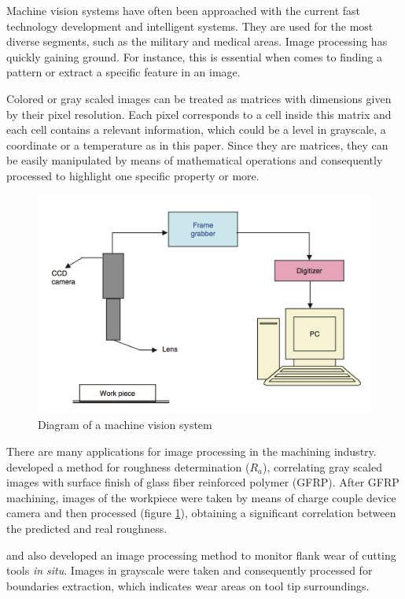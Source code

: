 Machine vision systems have often been approached with the current fast technology development and intelligent systems. They are used for the most diverse segments, such as the military and medical areas. Image processing has quickly gaining ground. For instance, this is essential when comes to finding a pattern or extract a specific feature in an image. 

Colored or gray scaled images can be treated as matrices with dimensions given by their pixel resolution. Each pixel corresponds to a cell inside this matrix and each cell contains a relevant information, which could be a level in grayscale, a coordinate or a temperature as in this paper. Since they are matrices, they can be easily manipulated by means of mathematical operations and consequently processed to highlight one specific property or more.

\begin{figure}[H]
	\centering
	\captionsetup{justification=centering}
	\includegraphics[scale=0.6]{Imagens/imgPro.png}
	\caption{Diagram of a machine vision system \cite{sarma2009surface}}
	\label{fig:imgProcessing}
\end{figure}

There are many applications for image processing in the machining industry.  developed a method for roughness determination ($R_{a}$), correlating gray scaled images with surface finish of glass fiber reinforced polymer (GFRP). After GFRP machining, images of the workpiece were taken by means of charge couple device camera and then processed (figure \ref{fig:imgProcessing}), obtaining a significant correlation between the predicted and real roughness.

 and  also developed an image processing method to monitor flank wear of cutting tools \emph{in situ}. Images in grayscale were taken and consequently processed for boundaries extraction, which indicates wear areas on tool tip surroundings.

